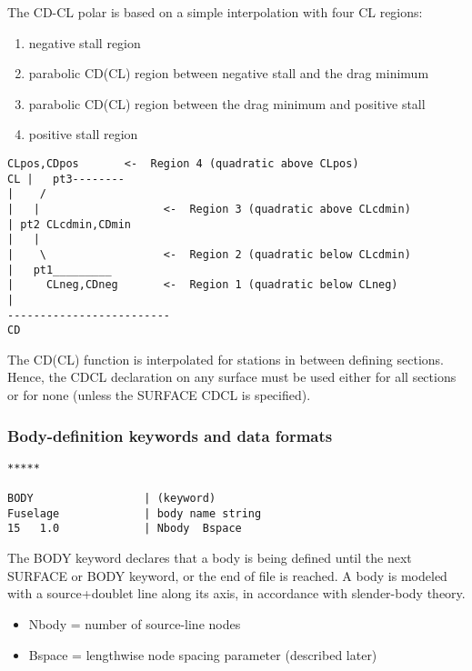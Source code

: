 The CD-CL polar is based on a simple interpolation with four CL regions:
\begin{enumerate}
	\item negative stall region
	\item parabolic CD(CL) region between negative stall and the drag minimum
	\item parabolic CD(CL) region between the drag minimum and positive stall
	\item positive stall region
\end{enumerate}

\begin{lstlisting}
CLpos,CDpos       <-  Region 4 (quadratic above CLpos)
CL |   pt3--------      
|    /                     
|   |                   <-  Region 3 (quadratic above CLcdmin)
| pt2 CLcdmin,CDmin  
|   |                
|    \                  <-  Region 2 (quadratic below CLcdmin)
|   pt1_________      
|     CLneg,CDneg       <-  Region 1 (quadratic below CLneg)
|                             
-------------------------
CD
\end{lstlisting}


The CD(CL) function is interpolated for stations in between
defining sections.  Hence, the CDCL declaration on any surface 
must be used either for all sections or for none (unless the SURFACE
CDCL is specified).


\subsubsection{Body-definition keywords and data formats}
\begin{lstlisting}
*****

BODY                 | (keyword)
Fuselage             | body name string
15   1.0             | Nbody  Bspace

\end{lstlisting}

The BODY keyword declares that a body is being defined until
the next SURFACE or BODY keyword, or the end of file is reached.  
A body is modeled with a source+doublet line along its axis,
in accordance with slender-body theory.

\begin{itemize}
	\item Nbody  =  number of source-line nodes
	\item Bspace =  lengthwise node spacing parameter (described later)
\end{itemize}

